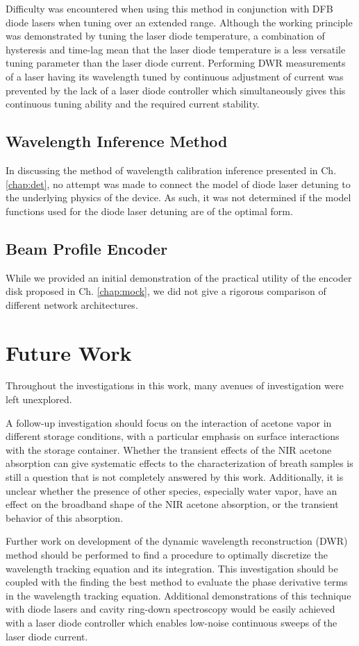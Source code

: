 \documentclass[8pt,a4paper]{report}
\begin{document}
	Difficulty was encountered when using this method in conjunction with DFB diode lasers when tuning over an extended range. Although the working principle was demonstrated by tuning the laser diode temperature, a combination of hysteresis and time-lag mean that the laser diode temperature is a less versatile tuning parameter than the laser diode current. Performing DWR measurements of a laser having its wavelength tuned by continuous adjustment of current was prevented by the lack of a laser diode controller which simultaneously gives this continuous tuning ability and the required current stability.
	
	\subsection{Wavelength Inference Method}
	In discussing the method of wavelength calibration inference presented in Ch. \ref{chap:det}, no attempt was made to connect the model of diode laser detuning to the underlying physics of the device. As such, it was not determined if the model functions used for the diode laser detuning are of the optimal form.
	
	\subsection{Beam Profile Encoder}
	While we provided an initial demonstration of the practical utility of the encoder disk proposed in Ch. \ref{chap:mock}, we did not give a rigorous comparison of different network architectures. 
	
	\section{Future Work}
	Throughout the investigations in this work, many avenues of investigation were left unexplored.
	
	A follow-up investigation should focus on the interaction of acetone vapor in different storage conditions, with a particular emphasis on surface interactions with the storage container. Whether the transient effects of the NIR acetone absorption can give systematic effects to the characterization of breath samples is still a question that is not completely answered by this work. Additionally, it is unclear whether the presence of other species, especially water vapor, have an effect on the broadband shape of the NIR acetone absorption, or the transient behavior of this absorption.
	
	Further work on development of the dynamic wavelength reconstruction (DWR) method should be performed to find a procedure to optimally discretize the wavelength tracking equation and its integration. This investigation should be coupled with the finding the best method to evaluate the phase derivative terms in the wavelength tracking equation. Additional demonstrations of this technique with diode lasers and cavity ring-down spectroscopy would be easily achieved with a laser diode controller which enables low-noise continuous sweeps of the laser diode current.
	
\end{document}
